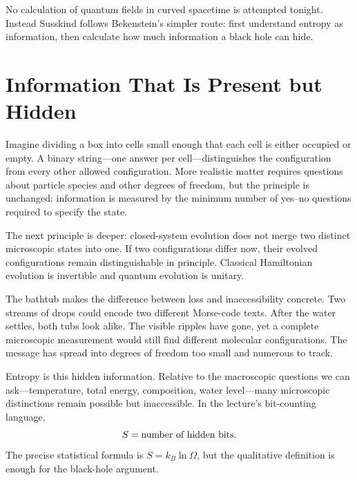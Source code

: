 No calculation of quantum fields in curved spacetime is attempted tonight.  Instead Susskind follows Bekenstein's simpler route: first understand entropy as information, then calculate how much information a black hole can hide.

\section{Information That Is Present but Hidden}

Imagine dividing a box into cells small enough that each cell is either occupied or empty.  A binary string---one answer per cell---distinguishes the configuration from every other allowed configuration.  More realistic matter requires questions about particle species and other degrees of freedom, but the principle is unchanged: information is measured by the minimum number of yes--no questions required to specify the state.

\begin{classroomqa}
\end{classroomqa}

The next principle is deeper: closed-system evolution does not merge two distinct microscopic states into one.  If two configurations differ now, their evolved configurations remain distinguishable in principle.  Classical Hamiltonian evolution is invertible and quantum evolution is unitary.

The bathtub makes the difference between loss and inaccessibility concrete.  Two streams of drops could encode two different Morse-code texts.  After the water settles, both tubs look alike.  The visible ripples have gone, yet a complete microscopic measurement would still find different molecular configurations.  The message has spread into degrees of freedom too small and numerous to track.

Entropy is this hidden information.  Relative to the macroscopic questions we can ask---temperature, total energy, composition, water level---many microscopic distinctions remain possible but inaccessible.  In the lecture's bit-counting language,
\begin{equation}
S=\hbox{number of hidden bits}.
\end{equation}
The precise statistical formula is \(S=k_B\ln\Omega\), but the qualitative definition is enough for the black-hole argument.

